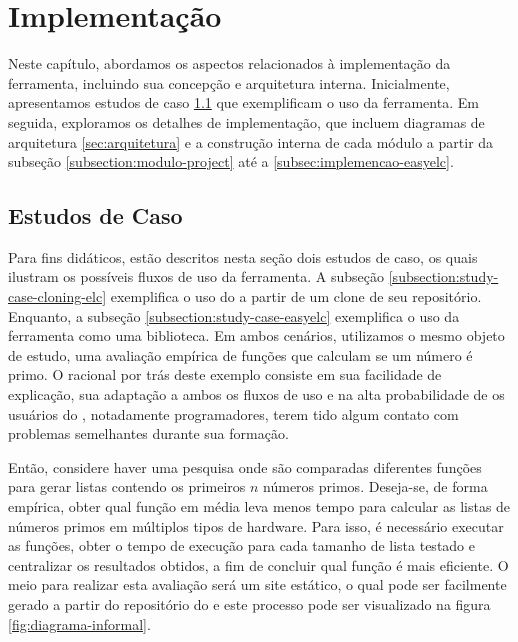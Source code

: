 \documentclass[12pt]{tcc}
\begin{document}
\chapter{Implementação}
	\label{cap:implementação}


	Neste capítulo, abordamos os aspectos relacionados à implementação da ferramenta, incluindo sua concepção e arquitetura interna.
	Inicialmente, apresentamos estudos de caso \ref{sec:estudos-de-caso} que exemplificam o uso da ferramenta.
	Em seguida, exploramos os detalhes de implementação, que incluem diagramas de arquitetura \ref{sec:arquitetura} e a construção interna de cada módulo a partir da subseção \ref{subsection:modulo-project} até a \ref{subsec:implemencao-easyelc}.

	\section{Estudos de Caso}
	\label{sec:estudos-de-caso}

	Para fins didáticos, estão descritos nesta seção dois estudos de caso, os quais ilustram os possíveis fluxos de uso da ferramenta.
	A subseção \ref{subsection:study-case-cloning-elc} exemplifica o uso do  a partir de um clone de seu repositório.
	Enquanto, a subseção \ref{subsection:study-case-easyelc} exemplifica o uso da ferramenta como uma biblioteca. 
	Em ambos cenários, utilizamos o mesmo objeto de estudo, uma avaliação empírica de funções que calculam se um número é primo.
	O racional por trás deste exemplo consiste em sua facilidade de explicação, sua adaptação a ambos os fluxos de uso e na alta probabilidade de os usuários do , notadamente programadores, terem tido algum contato com problemas semelhantes durante sua formação.

	Então, considere haver uma pesquisa onde são comparadas diferentes funções para gerar listas contendo os primeiros $n$ números primos. 
	Deseja-se, de forma empírica, obter qual função em média leva menos tempo para calcular as listas de números primos em múltiplos tipos de hardware.
	Para isso, é necessário executar as funções, obter o tempo de execução para cada tamanho de lista testado e centralizar os resultados obtidos, a fim de concluir qual função é mais eficiente.
	O meio para realizar esta avaliação será um site estático, o qual pode ser facilmente gerado a partir do repositório do  e este processo pode ser visualizado na figura \ref{fig:diagrama-informal}.
\end{document}
